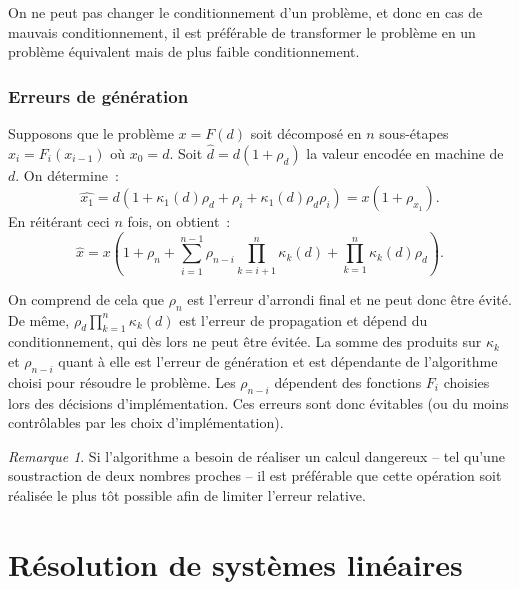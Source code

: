 \documentclass{article}
\theoremstyle{definition}
\theoremstyle{remark}
\newtheorem*{rmq}{Remarque}
\begin{document}
		On ne peut pas changer le conditionnement d'un problème, et donc en cas de mauvais conditionnement, il est préférable de transformer le problème en un
		problème équivalent mais de plus faible conditionnement.

		\subsubsection{Erreurs de génération}
		Supposons que le problème $x = F(d)$ soit décomposé en $n$ sous-étapes $x_i = F_i(x_{i-1})$ où $x_0 = d$. Soit $\widehat d = d(1+\rho_d)$ la valeur
		encodée en machine de $d$. On détermine~:
		\[\widehat {x_1} = d(1 + \kappa_1(d)\rho_d + \rho_i + \kappa_1(d)\rho_d\rho_i) = x(1 + \rho_{x_1}).\]
		En réitérant ceci $n$ fois, on obtient~:
		\[\widehat x = x\left(1 + \rho_n + \sum_{i=1}^{n-1}\rho_{n-i}\prod_{k=i+1}^{n}\kappa_k(d) + \prod_{k=1}^n\kappa_k(d)\rho_d\right).\]

		On comprend de cela que $\rho_n$ est l'erreur d'arrondi final et ne peut donc être évité. De même, $\rho_d\prod_{k=1}^n\kappa_k(d)$ est l'erreur de
		propagation et dépend du conditionnement, qui dès lors ne peut être évitée. La somme des produits sur $\kappa_k$ et $\rho_{n-i}$ quant à elle est
		l'erreur de génération et est dépendante de l'algorithme choisi pour résoudre le problème. Les $\rho_{n-i}$ dépendent des fonctions $F_i$ choisies lors
		des décisions d'implémentation. Ces erreurs sont donc évitables (ou du moins contrôlables par les choix d'implémentation).

		\begin{rmq} Si l'algorithme a besoin de réaliser un calcul dangereux -- tel qu'une soustraction de deux nombres proches -- il est préférable que cette
		opération soit réalisée le plus tôt possible afin de limiter l'erreur relative.
		\end{rmq}

\newpage
\section{Résolution de systèmes linéaires}
\end{document}
